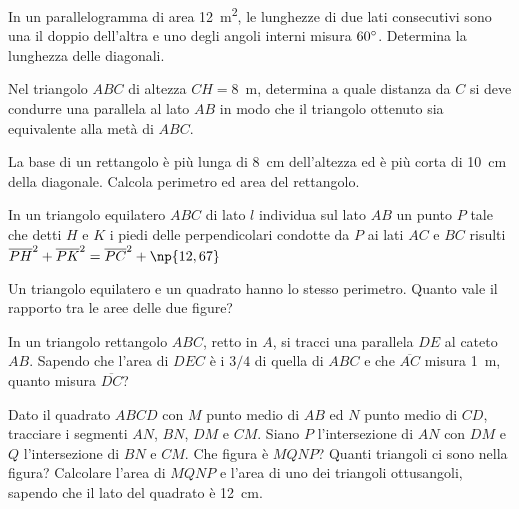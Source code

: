 \begin{multicols}{2}
\begin{esercizio}
\label{ese:7.36}
In un parallelogramma di area 12~m\textsuperscript{2}, le lunghezze di due lati consecutivi sono una il doppio dell'altra e uno degli angoli interni misura $60{}^{\circ}$. Determina la lunghezza delle diagonali.
\end{esercizio}

\begin{esercizio}
\label{ese:7.37}
Nel triangolo $ABC$ di altezza $CH=8$~m, determina a quale distanza da $C$ si deve condurre una parallela al lato $AB$ in modo che il triangolo ottenuto sia equivalente alla metà di $ABC$.
\end{esercizio}

\begin{esercizio}
\label{ese:7.38}
La base di un rettangolo è più lunga di 8~cm dell'altezza ed è più corta di 10~cm della diagonale. Calcola perimetro ed area del rettangolo. 			
\end{esercizio}

\begin{esercizio}
\label{ese:7.39}
In un triangolo equilatero $ABC$ di lato $l$ individua sul lato $AB$ un punto $P$ tale che detti $H$ e $K$ i piedi delle perpendicolari condotte da $P$ ai lati $AC$ e $BC$ risulti $\overline{PH}^2+\overline{PK}^2=\overline{PC}^2+\np{12,67}$
\end{esercizio}

\begin{esercizio}
\label{ese:7.40}
Un triangolo equilatero e un quadrato hanno lo stesso perimetro. Quanto vale il rapporto tra le aree delle due figure?
\end{esercizio}

\begin{esercizio}
\label{ese:7.41}
In un triangolo rettangolo $ABC$, retto in $A$, si tracci una parallela $DE$ al cateto $AB$. Sapendo che l'area di $DEC$ è i $3/4$ di quella di $ABC$ e che $\overline{AC}$ misura 1~m, quanto misura $\overline{DC}$?
\end{esercizio}

\begin{esercizio}
\label{ese:7.42}
Dato il quadrato $ABCD$ con $M$ punto medio di $AB$ ed $N$ punto medio di $CD$, tracciare i segmenti $AN$, $BN$, $DM$ e $CM$. Siano $P$ l'intersezione di $AN$ con $DM$ e $Q$ l'intersezione di $BN$ e $CM$. Che figura è $MQNP$? Quanti triangoli ci sono nella figura? Calcolare l'area di $MQNP$ e l'area di uno dei triangoli ottusangoli, sapendo che il lato del quadrato è 12~cm.
\end{esercizio}


\end{multicols}
